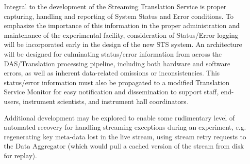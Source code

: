 Integral to the development of the Streaming Translation Service
is proper capturing, handling and reporting of
System Status and Error conditions.
To emphasize the importance of this information
in the proper administration and maintenance
of the experimental facility,
consideration of Status/Error logging will be incorporated
early in the design of the new STS system.
An architecture will be designed for culminating status/error information
from across the DAS/Translation processing pipeline,
including both hardware and software errors,
as well as inherent data-related omissions or inconsistencies.
This status/error information must also be propagated
to a modified Translation Service Monitor
for easy notification and dissemination to support staff, end-users,
instrument scientists, and instrument hall coordinators.

Additional development may be explored to enable some rudimentary level of
automated recovery for handling streaming exceptions during an experiment,
e.g. regenerating key meta-data lost in the live stream,
using stream retry requests to the Data Aggregator
(which would pull a cached version of the stream from disk for replay).

